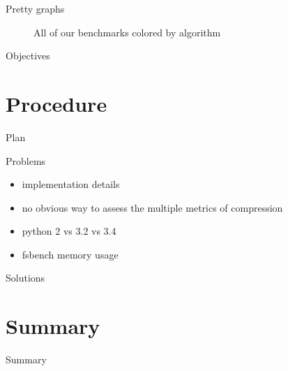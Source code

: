 \documentclass[10pt, compress]{beamer}
\begin{document}
\begin{frame}{Pretty graphs}
    \begin{figure}[h]
        \begin{center}
            \scalebox{0.1}{}
        \end{center}
        \caption{All of our benchmarks colored by algorithm}
        \label{fig:much_color}
    \end{figure}
\end{frame}

\begin{frame}{Objectives}
\end{frame}

\section{Procedure}
\begin{frame}{Plan}
\end{frame}

\begin{frame}{Problems}
	\begin{itemize}
        \item implementation details
        \item no obvious way to assess the multiple metrics of compression
        \item python 2 vs 3.2 vs 3.4
        \item fsbench memory usage
    \end{itemize}
\end{frame}

\begin{frame}{Solutions}
\end{frame}

\section{Summary}
\begin{frame}{Summary}
\end{frame}
\end{document}
